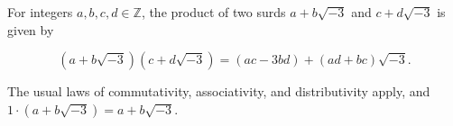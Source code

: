 For integers $a, b, c, d \in \mathbb{Z}$, the product of two surds $a + b\sqrt{-3}$ and $c + d\sqrt{-3}$ is given by

$$
(a + b\sqrt{-3})(c + d\sqrt{-3}) = (ac - 3bd) + (ad + bc)\sqrt{-3}.
$$

The usual laws of commutativity, associativity, and distributivity apply, and $1 \cdot (a + b\sqrt{-3}) = a + b\sqrt{-3}$.
